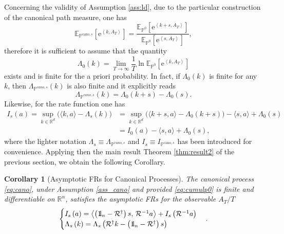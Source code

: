 \documentclass[a4paper,11pt]{article}
\numberwithin{equation}{section}
\newcommand{\bbbone}{\mathchoice {\rm 1\mskip-4mu l} {\rm 1\mskip-4mu l}
{\rm 1\mskip-4.5mu l} {\rm 1\mskip-5mu l}}
\newtheorem{corollary}[theorem]{Corollary}
\begin{document}
Concerning the validity of Assumption \ref{ass:ld}, due to the particular construction of the canonical path measure, one has
\begin{equation}
    \mathbb{E}_{\mathbb{P}^{\mathrm{cano},s}} \left[ \mathrm{e}^{\left\langle k, A_T \right\rangle} \right] = \frac{\mathbb{E}_{\mathbb{P}^0} \left[ \mathrm{e}^{\left\langle k+s, A_T \right\rangle} \right]}{\mathbb{E}_{\mathbb{P}^0} \left[ \mathrm{e}^{\left\langle s, A_T \right\rangle} \right]} ,
\end{equation}
therefore it is sufficient to assume that the quantity
\begin{equation}\label{eq:cumulp0}
    \Lambda_{0}(k) = \lim_{T \to \infty} \frac{1}{T} \ln \mathbb{E}_{\mathbb{P}^0} \left[ \mathrm{e}^{\left\langle k, A_T \right\rangle} \right]
\end{equation}
exists and is finite for the a priori probability. In fact, if $\Lambda_0 (k)$ is finite for any $k$, then $\Lambda_{\mathbb{P}^{cano,s}}(k)$ is also finite and it explicitly reads 
\begin{equation}
\label{eq:jolie}    
\Lambda_{\mathbb{P}^{cano,s}}(k) = \Lambda_0 (k+s) - \Lambda_0 (s).
\end{equation}
Likewise, for the rate function one has
\begin{align}
    I_s(a) = \sup_{k \in \mathbb{R}^d}\Big( \langle k, a \rangle - \Lambda_s(k) \Big) &= \sup_{k \in \mathbb{R}^d} \Big( \langle k +s , a \rangle - \Lambda_0(k + s) \Big) - \langle s, a \rangle + \Lambda_0(s)  \nonumber\\
    &= I_0(a) - \langle s, a \rangle + \Lambda_0(s) ,
    \label{eq:jolieRF} 
\end{align}   
where the lighter notation $\Lambda_s \equiv \Lambda_{\mathbb{P}^{cano,s}}$ and $I_s \equiv I_{\mathbb{P}^{\mathrm{cano},s}} $ has been introduced for convenience.
Applying then the main result Theorem \ref{thm:result2} of the previous section, we obtain the following Corollary.
\begin{corollary}[Asymptotic FRs for Canonical Processes]  
The canonical process \eqref{eq:cano}, under Assumption \ref{ass_cano} and provided \eqref{eq:cumulp0} is finite and differentiable on $\mathbb{R}^n$, satisfies the asymptotic FRs for the observable $A_T/T$
\begin{equation}\label{eq:MR-1}
     \begin{cases}
 I_s\left(a\right)=\left\langle \left(\bbbone_n-\mathcal{R}^{\dagger}\right) s, \, \mathcal{R}^{-1} a\right\rangle +I_s\left(\mathcal{R}^{-1} a\right)\\
\Lambda_s \left(k\right) = \Lambda_s \left(\mathcal{R}^{\dagger}k -\left(\bbbone_n -\mathcal{R}^{\dagger}\right) s\right) 
     \end{cases}.
\end{equation}
\end{corollary}
\end{document}
